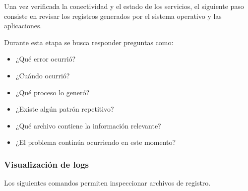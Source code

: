 \documentclass[a4paper,10pt]{article}
\begin{document}
Una vez verificada la conectividad y el estado de los servicios, el siguiente
paso consiste en revisar los registros generados por el sistema operativo y las
aplicaciones.

Durante esta etapa se busca responder preguntas como:

\begin{itemize}
\item ¿Qué error ocurrió?
\item ¿Cuándo ocurrió?
\item ¿Qué proceso lo generó?
\item ¿Existe algún patrón repetitivo?
\item ¿Qué archivo contiene la información relevante?
\item ¿El problema continúa ocurriendo en este momento?
\end{itemize}


\subsubsection{Visualización de logs}

Los siguientes comandos permiten inspeccionar archivos de registro.
\end{document}
